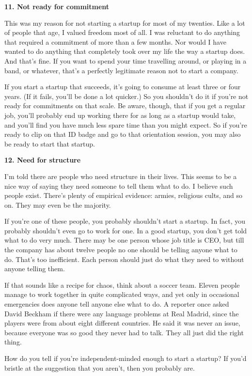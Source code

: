 \documentclass[12pt]{book}
\begin{document}
\textbf{11. Not ready for commitment}

This was my reason for not starting a startup for most of my twenties.
Like a lot of people that age, I valued freedom most of all. I was
reluctant to do anything that required a commitment of more than a few
months. Nor would I have wanted to do anything that completely took over
my life the way a startup does. And that's fine. If you want to spend
your time travelling around, or playing in a band, or whatever, that's a
perfectly legitimate reason not to start a company.

If you start a startup that succeeds, it's going to consume at least
three or four years. (If it fails, you'll be done a lot quicker.) So you
shouldn't do it if you're not ready for commitments on that scale. Be
aware, though, that if you get a regular job, you'll probably end up
working there for as long as a startup would take, and you'll find you
have much less spare time than you might expect. So if you're ready to
clip on that ID badge and go to that orientation session, you may also
be ready to start that startup.

\textbf{12. Need for structure}

I'm told there are people who need structure in their lives. This seems
to be a nice way of saying they need someone to tell them what to do. I
believe such people exist. There's plenty of empirical evidence: armies,
religious cults, and so on. They may even be the majority.

If you're one of these people, you probably shouldn't start a startup.
In fact, you probably shouldn't even go to work for one. In a good
startup, you don't get told what to do very much. There may be one
person whose job title is CEO, but till the company has about twelve
people no one should be telling anyone what to do. That's too
inefficient. Each person should just do what they need to without anyone
telling them.

If that sounds like a recipe for chaos, think about a soccer team.
Eleven people manage to work together in quite complicated ways, and yet
only in occasional emergencies does anyone tell anyone else what to do.
A reporter once asked David Beckham if there were any language problems
at Real Madrid, since the players were from about eight different
countries. He said it was never an issue, because everyone was so good
they never had to talk. They all just did the right thing.

How do you tell if you're independent-minded enough to start a startup?
If you'd bristle at the suggestion that you aren't, then you probably
are.
\end{document}

